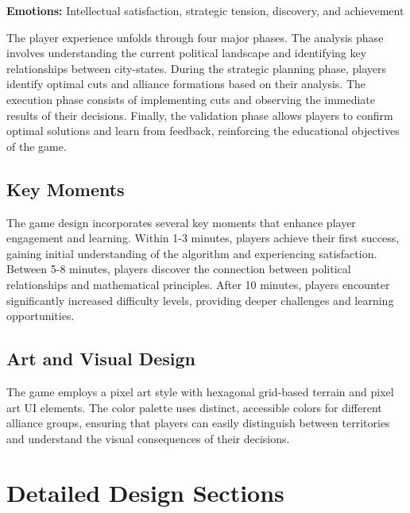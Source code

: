 \documentclass[english]{tudscrreprt}
\begin{document}
\textbf{Emotions:} Intellectual satisfaction, strategic tension, discovery, and achievement

The player experience unfolds through four major phases. The analysis phase involves understanding the current political landscape and identifying key relationships between city-states. During the strategic planning phase, players identify optimal cuts and alliance formations based on their analysis. The execution phase consists of implementing cuts and observing the immediate results of their decisions. Finally, the validation phase allows players to confirm optimal solutions and learn from feedback, reinforcing the educational objectives of the game.

\subsection{Key Moments}
The game design incorporates several key moments that enhance player engagement and learning. Within 1-3 minutes, players achieve their first success, gaining initial understanding of the algorithm and experiencing satisfaction. Between 5-8 minutes, players discover the connection between political relationships and mathematical principles. After 10 minutes, players encounter significantly increased difficulty levels, providing deeper challenges and learning opportunities.

\subsection{Art and Visual Design}
The game employs a pixel art style with hexagonal grid-based terrain and pixel art UI elements. The color palette uses distinct, accessible colors for different alliance groups, ensuring that players can easily distinguish between territories and understand the visual consequences of their decisions.



\section{Detailed Design Sections}
\end{document}
